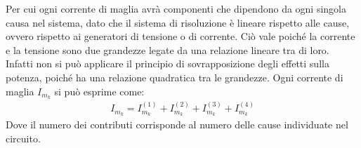 \documentclass{article}
\numberwithin{equation}{subsection}
\begin{document}
Per cui ogni corrente di maglia avrà componenti che dipendono da ogni singola causa nel sistema, dato che il sistema di risoluzione è lineare rispetto alle cause, ovvero 
rispetto ai generatori di tensione o di corrente. Ciò vale poiché la corrente e la tensione sono due grandezze legate da una relazione lineare tra di loro. Infatti non si può 
applicare il principio di sovrapposizione degli effetti sulla potenza, poiché ha una relazione quadratica tra le grandezze. Ogni corrente di maglia $I_{m_k}$ si può esprime come:
\begin{gather*}
    I_{m_k}=I_{m_k}^{(1)}+I_{m_k}^{(2)}+I_{m_k}^{(3)}+I_{m_k}^{(4)}
\end{gather*}
Dove il numero dei contributi corrisponde al numero delle cause individuate nel circuito. 
\end{document}
